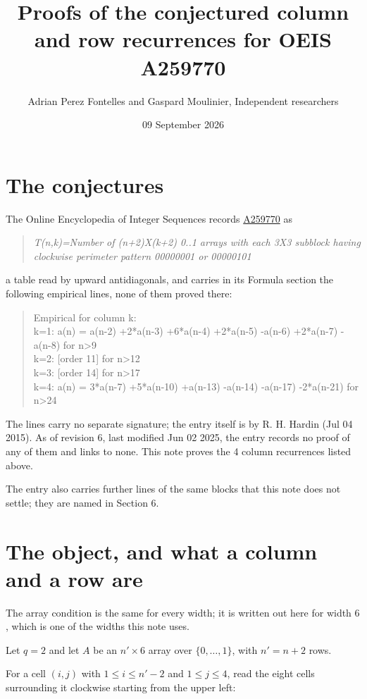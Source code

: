 \documentclass[11pt]{article}
\title{Proofs of the conjectured column and row recurrences for OEIS A259770}
\author{Adrian Perez Fontelles and Gaspard Moulinier, Independent researchers}
\date{09 September 2026}
\theoremstyle{definition}
\begin{document}
\maketitle
\section{The conjectures}

The Online Encyclopedia of Integer Sequences records \href{https://oeis.org/A259770}{A259770} as

\begin{quote}\itshape T(n,k)=Number of (n+2)X(k+2) 0..1 arrays with each 3X3 subblock having clockwise perimeter pattern 00000001 or 00000101\end{quote}

a table read by upward antidiagonals, and carries in its Formula section the following empirical lines, none of them proved there:

\begin{quote}\ttfamily Empirical for column k:\\
k=1: a(n) = a(n-2) +2*a(n-3) +6*a(n-4) +2*a(n-5) -a(n-6) +2*a(n-7) -a(n-8) for n>9\\k=2: [order 11] for n>12\\k=3: [order 14] for n>17\\k=4: a(n) = 3*a(n-7) +5*a(n-10) +a(n-13) -a(n-14) -a(n-17) -2*a(n-21) for n>24\end{quote}

The lines carry no separate signature; the entry itself is by R. H. Hardin (Jul 04 2015). As of revision 6, last modified Jun 02 2025, the entry records no proof of any of them and links to none. This note proves the 4 column recurrences listed above.

The entry also carries further lines of the same blocks that this note does not settle; they are named in Section 6.

\section{The object, and what a column and a row are}

The array condition is the same for every width; it is written out here for width $6$, which is one of the widths this note uses.

Let $q = 2$ and let $A$ be an $n' \times 6$ array over $\{0,\dots,1\}$, with $n' = n + 2$ rows.

For a cell $(i,j)$ with $1 \le i \le n'-2$ and $1 \le j \le 4$, read the eight cells surrounding it clockwise starting from the upper left:
\end{document}
